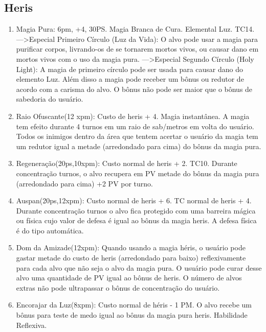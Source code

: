 \subsection{Heris}

\begin{enumerate}
	\item Magia Pura: 6pm, +4, 30PS. Magia Branca de Cura. Elemental Luz. TC14.\newline
--->Especial Primeiro Círculo (Luz da Vida): O alvo pode usar a magia para purificar corpos, livrando-os de se tornarem mortos vivos, ou causar dano em mortos vivos com o uso da magia pura.\newline
--->Especial Segundo Círculo (Holy Light): A magia de primeiro círculo pode ser usada para causar dano do elemento Luz. Além disso a magia pode receber um bônus ou redutor de acordo com a carisma do alvo. O bônus não pode ser maior que o bônus de sabedoria do usuário.

	\item Raio Ofuscante(12 xpm): Custo de heris + 4. Magia instantânea.\newline
A magia tem efeito durante 4 turnos em um raio de sab/metros em volta do usuário. Todos os inimigos dentro da área que tentem acertar o usuário da magia tem um redutor igual a metade (arredondado para cima) do bônus da magia pura. 

	\item Regeneração(20ps,10xpm): Custo normal de heris + 2. TC10.\newline
Durante concentração turnos, o alvo recupera em PV metade do bônus da magia pura (arredondado para cima) +2 PV por turno.

\item Auspan(20ps,12xpm): Custo normal de heris + 6. TC normal de heris + 4.\newline
Durante concentração turnos o alvo fica protegido com uma barreira mágica ou física cujo valor de defesa é igual ao bônus da magia heris. A defesa física é do tipo automática.

	\item Dom da Amizade(12xpm): Quando usando a magia héris, o usuário pode gastar metade do custo de heris (arredondado para baixo) reflexivamente para cada alvo que não seja o alvo da magia pura. O usuário pode curar desse alvo uma quantidade de PV igual ao bônus de heris. O número de alvos extras não pode ultrapassar o bônus de concentração do usuário.
	
	\item Encorajar da Luz(8xpm): Custo normal de héris - 1 PM.\newline
O alvo recebe um bônus para teste de medo igual ao bônus da magia pura heris. Habilidade Reflexiva.


\end{enumerate}
